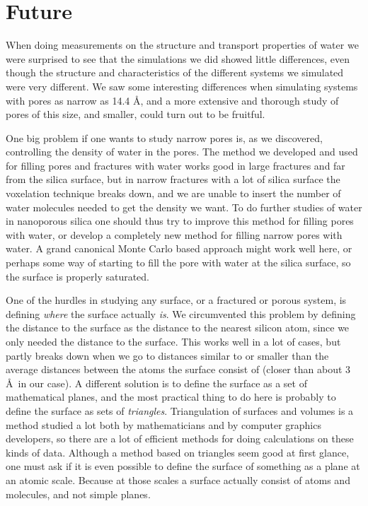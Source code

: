 \section{Future}
When doing measurements on the structure and transport properties of water we were surprised to see that the simulations we did showed little differences, even though the structure and characteristics of the different systems we simulated were very different. We saw some interesting differences when simulating systems with pores as narrow as 14.4 \AA, and a more extensive and thorough study of pores of this size, and smaller, could turn out to be fruitful. 

One big problem if one wants to study narrow pores is, as we discovered, controlling the density of water in the pores. The method we developed and used for filling pores and fractures with water works good in large fractures and far from the silica surface, but in narrow fractures with a lot of silica surface the voxelation technique breaks down, and we are unable to insert the number of water molecules needed to get the density we want. To do further studies of water in nanoporous silica one should thus try to improve this method for filling pores with water, or develop a completely new method for filling narrow pores with water. A grand canonical Monte Carlo based approach might work well here, or perhaps some way of starting to fill the pore with water at the silica surface, so the surface is properly saturated.

One of the hurdles in studying any surface, or a fractured or porous system, is defining \emph{where} the surface actually \emph{is}. We circumvented this problem by defining the distance to the surface as the distance to the nearest silicon atom, since we only needed the distance to the surface. This works well in a lot of cases, but partly breaks down when we go to distances similar to or smaller than the average distances between the atoms the surface consist of (closer than about 3 \AA\ in our case). A different solution is to define the surface as a set of mathematical planes, and the most practical thing to do here is probably to define the surface as sets of \emph{triangles}. Triangulation of surfaces and volumes is a method studied a lot both by mathematicians and by computer graphics developers, so there are a lot of efficient methods for doing calculations on these kinds of data. Although a method based on triangles seem good at first glance, one must ask if it is even possible to define the surface of something as a plane at an atomic scale. Because at those scales a surface actually consist of atoms and molecules, and not simple planes.

